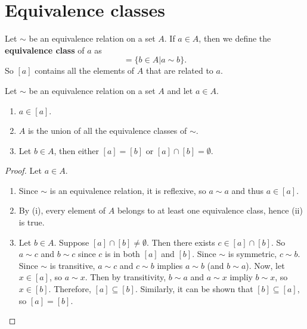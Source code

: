 \documentclass[../abstract_algebra.tex]{subfiles}
\begin{document}
    \section{Equivalence classes}
        \begin{definition}
            Let $\sim$ be an equivalence relation on a set $A$.
            If $a\in A$, then we define the \textbf{equivalence class} of $a$ as
            \begin{equation}
                [a]=\{b\in A|a\sim b\}.
            \end{equation}
            So $[a]$ contains all the elements of $A$ that are related to $a$.
        \end{definition}
        \begin{theorem}
            Let $\sim$ be an equivalence relation on a set $A$ and let $a\in A$.
            \begin{enumerate}[label={\upshape(\roman*)}]
                \item $a\in[a]$.
                \item $A$ is the union of all the equivalence classes of $\sim$.
                \item Let $b\in A$, then either $[a]=[b]$ or $[a]\cap[b]=\emptyset$.
            \end{enumerate}
        \end{theorem}
        \begin{proof}
            Let $a\in A$.
            \begin{enumerate}[label={\upshape(\roman*)}]
                \item Since $\sim$ is an equivalence relation, it is reflexive, so $a\sim a$ and thus $a\in[a]$.
                \item By (i), every element of $A$ belongs to at least one equivalence class, hence (ii) is true.
                \item Let $b\in A$. Suppose $[a]\cap[b]\neq\emptyset$. Then there exists $c\in[a]\cap[b]$.
                So $a\sim c$ and $b\sim c$ since $c$ is in both $[a]$ and $[b]$.
                Since $\sim$ is symmetric, $c\sim b$. Since $\sim$ is transitive, $a\sim c$ and $c\sim b$ implies $a\sim b$ (and $b\sim a$).
                Now, let $x\in[a]$, so $a\sim x$. Then by transitivity, $b\sim a$ and $a\sim x$ impliy $b\sim x$, so $x\in[b]$.
                Therefore, $[a]\subseteq[b]$.
                Similarly, it can be shown that $[b]\subseteq[a]$, so $[a]=[b]$.
            \end{enumerate}
        \end{proof}
\end{document}
